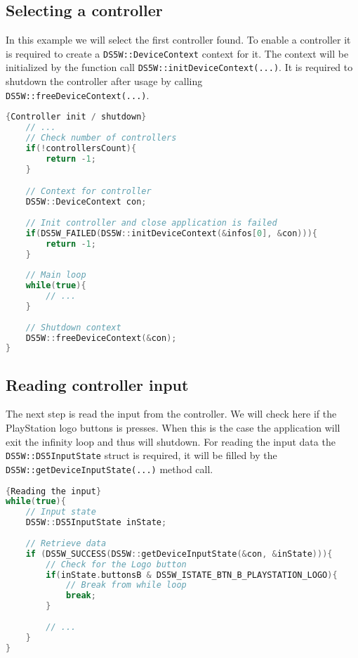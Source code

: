 \subsection{Selecting a controller}
In this example we will select the first controller found. To enable a controller it is required to create a \texttt{DS5W::DeviceContext} context for it. The context will be initialized by the function call \texttt{DS5W::initDeviceContext(...)}. It is required to shutdown the controller after usage by calling \\
\texttt{DS5W::freeDeviceContext(...)}.\\

\begin{minipage}{\textwidth}
\begin{lstlisting}[language=C++,label=code2,caption={Controller init / shutdown}]{Controller init / shutdown}
	// ...
	// Check number of controllers
	if(!controllersCount){
		return -1;
	}

	// Context for controller
	DS5W::DeviceContext con;
	
	// Init controller and close application is failed
	if(DS5W_FAILED(DS5W::initDeviceContext(&infos[0], &con))){
		return -1;
	}
	
	// Main loop
	while(true){
		// ...
	}
	
	// Shutdown context
	DS5W::freeDeviceContext(&con);
}
\end{lstlisting}
\end{minipage}

\subsection{Reading controller input}
The next step is read the input from the controller. We will check here if the PlayStation logo buttons is presses. When this is the case the application will exit the infinity loop and thus will shutdown. For reading the input data the \texttt{DS5W::DS5InputState} struct is required, it will be filled by the \texttt{DS5W::getDeviceInputState(...)} method call. \\

\begin{minipage}{\textwidth}
\begin{lstlisting}[language=C++,label=code3,caption={Reading the input}]{Reading the input}
while(true){
	// Input state
	DS5W::DS5InputState inState;
	
	// Retrieve data
	if (DS5W_SUCCESS(DS5W::getDeviceInputState(&con, &inState))){
		// Check for the Logo button
		if(inState.buttonsB & DS5W_ISTATE_BTN_B_PLAYSTATION_LOGO){
			// Break from while loop
			break;
		}
		
		// ...
	}
}
\end{lstlisting}
\end{minipage}

